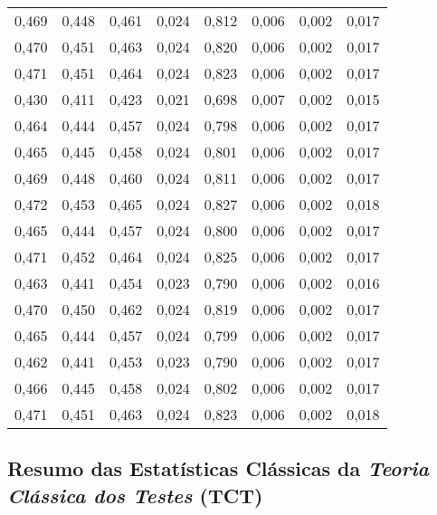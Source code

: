 \documentclass[
  portuguese,
  11pt,
  a4paper,
  DIV=11,
  numbers=noendperiod]{scrreprt}
\begin{document}
\begin{table}
{\begin{tabular*}{\linewidth}{@{\extracolsep{\fill}}cccccccc}
0,469 & 0,448 & 0,461 & 0,024 & 0,812 & 0,006 & 0,002 & 0,017 \\ 
0,470 & 0,451 & 0,463 & 0,024 & 0,820 & 0,006 & 0,002 & 0,017 \\ 
0,471 & 0,451 & 0,464 & 0,024 & 0,823 & 0,006 & 0,002 & 0,017 \\ 
0,430 & 0,411 & 0,423 & 0,021 & 0,698 & 0,007 & 0,002 & 0,015 \\ 
0,464 & 0,444 & 0,457 & 0,024 & 0,798 & 0,006 & 0,002 & 0,017 \\ 
0,465 & 0,445 & 0,458 & 0,024 & 0,801 & 0,006 & 0,002 & 0,017 \\ 
0,469 & 0,448 & 0,460 & 0,024 & 0,811 & 0,006 & 0,002 & 0,017 \\ 
0,472 & 0,453 & 0,465 & 0,024 & 0,827 & 0,006 & 0,002 & 0,018 \\ 
0,465 & 0,444 & 0,457 & 0,024 & 0,800 & 0,006 & 0,002 & 0,017 \\ 
0,471 & 0,452 & 0,464 & 0,024 & 0,825 & 0,006 & 0,002 & 0,017 \\ 
0,463 & 0,441 & 0,454 & 0,023 & 0,790 & 0,006 & 0,002 & 0,016 \\ 
0,470 & 0,450 & 0,462 & 0,024 & 0,819 & 0,006 & 0,002 & 0,017 \\ 
0,465 & 0,444 & 0,457 & 0,024 & 0,799 & 0,006 & 0,002 & 0,017 \\ 
0,462 & 0,441 & 0,453 & 0,023 & 0,790 & 0,006 & 0,002 & 0,017 \\ 
0,466 & 0,445 & 0,458 & 0,024 & 0,802 & 0,006 & 0,002 & 0,017 \\ 
0,471 & 0,451 & 0,463 & 0,024 & 0,823 & 0,006 & 0,002 & 0,018 \\ 
\bottomrule
\end{tabular*}

}

\end{table}%

\subsection{\texorpdfstring{Resumo das Estatísticas Clássicas da
\emph{Teoria Clássica dos Testes}
(TCT)}{Resumo das Estatísticas Clássicas da Teoria Clássica dos Testes (TCT)}}\label{resumo-das-estatuxedsticas-cluxe1ssicas-da-teoria-cluxe1ssica-dos-testes-tct}
\end{document}
